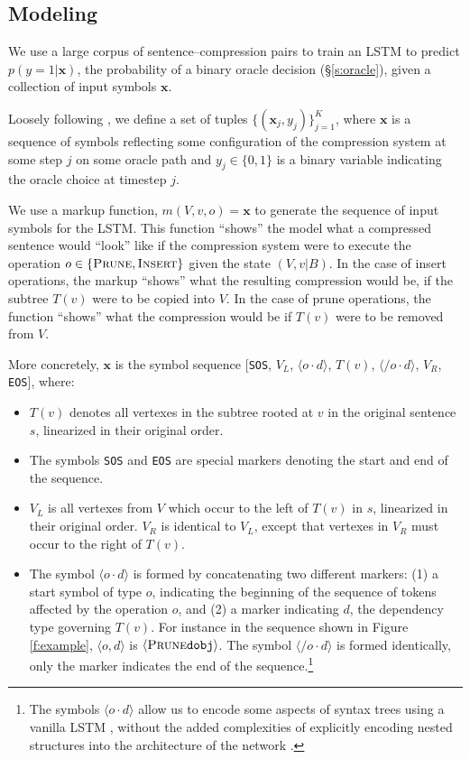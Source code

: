 \documentclass[11pt,a4paper]{article}
\begin{document}
\subsection{Modeling}\label{s:modeling}

We use a large corpus of sentence--compression pairs \cite{filippova2013overcoming} to train an LSTM to predict $p(y=1 | \bm{x})$, the probability of a binary oracle decision (\S\ref{s:oracle}), given a collection of input symbols $\bm{x}$.

Loosely following \citet{D14-1082}, we define a set of tuples $\{(\bm{x}_j, y_j) \}_{j=1}^{K}$, where $\bm{x}$ is a sequence of symbols reflecting some configuration of the compression system at some step $j$ on some oracle path and $y_j \in \{0,1\}$ is a binary variable indicating the oracle choice at timestep $j$. 

We use a markup function, $m(V,v,o)=\bm{x}$ to generate the sequence of input symbols for the LSTM. This function ``shows'' the model what a compressed sentence would ``look'' like if the compression system were to execute the operation $o \in \{\textsc{Prune}, \textsc{Insert}\}$ given the state $(V, v|B)$. In the case of insert operations, the markup ``shows'' what the resulting compression would be, if the subtree $T(v)$ were to be copied  into $V$. In the case of prune operations, the function ``shows'' what the compression would be if $T(v)$ were to be removed from $V$.

More concretely, $\bm{x}$ is the symbol sequence [\texttt{SOS}, $V_L$, $\langle {o \cdot d} \rangle$, $T(v)$, $\langle{/o\cdot d}\rangle$, $V_R$, \texttt{EOS}], where:

\begin{itemize}
\item{$T(v)$ denotes all vertexes in the subtree rooted at $v$ in the original sentence $s$, linearized in their original order.}
\item{The symbols \texttt{SOS} and \texttt{EOS} are special markers denoting the start and end of the sequence.}
\item{$V_L$ is all vertexes from $V$ which occur to the left of $T(v)$ in $s$, linearized in their original order. $V_R$ is identical to $V_L$, except that vertexes in $V_R$ must occur to the right of $T(v)$.}
\item{The symbol $\langle o \cdot d \rangle$ is formed by concatenating two different markers: (1) a start symbol of type $o$, indicating the beginning of the sequence of tokens affected by the operation $o$, and (2) a marker indicating $d$, the dependency type governing $T(v)$. For instance in the sequence shown in Figure \ref{f:example}, $\langle o, d \rangle$ is $\langle \textsc{Prune} \texttt{dobj} \rangle$. The symbol $\langle / o \cdot d \rangle$ is formed identically, only the marker indicates the end of the sequence.\footnote{The symbols $\langle {o \cdot d} \rangle$ allow us to encode some aspects of syntax trees using a vanilla LSTM \cite{Vinyals2015GrammarAA,Aharoni2017TowardsSN}, without the added complexities of explicitly encoding nested structures into the architecture of the network \cite{Tai2015ImprovedSR,Dyer2016RecurrentNN}.}}
\end{itemize}
\end{document}
